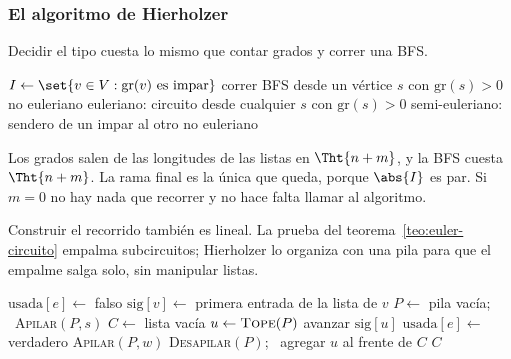 \documentclass[11pt,letterpaper]{article}
\begin{document}
\subsubsection*{El algoritmo de Hierholzer}

Decidir el tipo cuesta lo mismo que contar grados y correr una BFS.

\begin{algorithm}[H]
\caption{\textsc{Tipo-Euler}$(G)$}
\label{alg:tipo-euler}
\begin{algorithmic}[1]
  \State $I \gets \set{v \in V : \text{gr}(v) \text{ es impar}}$
  \State correr BFS desde un vértice $s$ con $\text{gr}(s) > 0$
    \State \Return no euleriano 
    \State \Return euleriano: circuito desde cualquier $s$ con
           $\text{gr}(s) > 0$
    \State \Return semi-euleriano: sendero de un impar al otro
  \Else
    \State \Return no euleriano 
  \EndIf
\EndProcedure
\end{algorithmic}
\end{algorithm}

Los grados salen de las longitudes de las listas en $\Tht{n + m}$, y
la BFS cuesta $\Tht{n + m}$. La rama final es la única que queda,
porque $\abs{I}$ es par. Si $m = 0$ no hay nada que recorrer y no
hace falta llamar al algoritmo.

Construir el recorrido también es lineal. La prueba del
teorema~\ref{teo:euler-circuito} empalma subcircuitos; Hierholzer lo
organiza con una pila para que el empalme salga solo, sin manipular
listas.

\begin{algorithm}[H]
\caption{\textsc{Hierholzer}$(G, s)$}
\label{alg:hierholzer}
\begin{algorithmic}[1]
    \State $\text{usada}[e] \gets$ falso
  \EndFor
    \State $\text{sig}[v] \gets$ primera entrada de la lista de $v$
  \EndFor
  \State $P \gets$ pila vacía; \ \textsc{Apilar}$(P, s)$
  \State $C \gets$ lista vacía
    \State $u \gets \textsc{Tope}(P)$
      \State avanzar $\text{sig}[u]$
    \EndWhile
      \State $\text{usada}[e] \gets$ verdadero
      \State \textsc{Apilar}$(P, w)$ 
    \Else {}
      \State \textsc{Desapilar}$(P)$; \ agregar $u$ al frente de $C$
    \EndIf
  \EndWhile
  \State \Return $C$
\EndProcedure
\end{algorithmic}
\end{algorithm}
\end{document}
